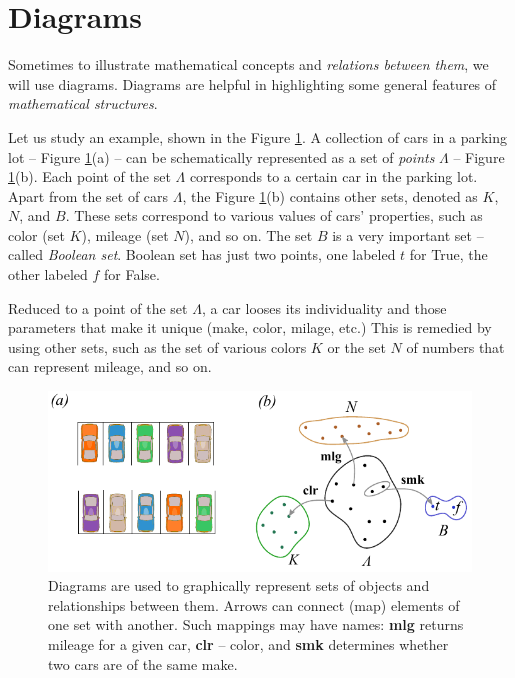 \section{Diagrams}
Sometimes to illustrate mathematical concepts and \emph{relations between them},
we will use diagrams. Diagrams are helpful in highlighting
some general features of \emph{mathematical structures}.

Let us study an example, shown in the Figure \ref{fig:diagrams}. A
collection of cars in a parking lot -- Figure \ref{fig:diagrams}(a) --
can be schematically represented
as a set of \emph{points} $\Lambda$ -- Figure
\ref{fig:diagrams}(b). Each point of the set $\Lambda$ corresponds to a
certain car in the parking lot. Apart from the set of cars $\Lambda$, the Figure
\ref{fig:diagrams}(b) contains other sets, denoted as $K$, $N$, and
$B$. These sets correspond to various values of cars' properties, such
as color (set $K$), mileage (set $N$), and so on. The set $B$ is a very
important set --
called \emph{Boolean set}. Boolean set has just two points, one
labeled $t$ for True, the other labeled $f$ for False.

Reduced to a point of the set $\Lambda$, a car looses its individuality
and those parameters that
make it unique (make, color, milage, etc.) This is remedied by using
other sets, such as the set of
various colors $K$ or the set $N$ of numbers that can represent
mileage, and so on.
\begin{figure}[htbp]
  \centering
  \includegraphics[scale=1.0]{../01Introduction/pics/diagrams}
  \caption{Diagrams are used to graphically represent sets of objects
    and relationships between them. Arrows can connect (map) elements
    of one set with another. Such mappings may have names: {\bf mlg}
    returns mileage for a given car, {\bf clr} -- color, and {\bf smk}
  determines whether two cars are of the same make.}
  \label{fig:diagrams}
\end{figure}

